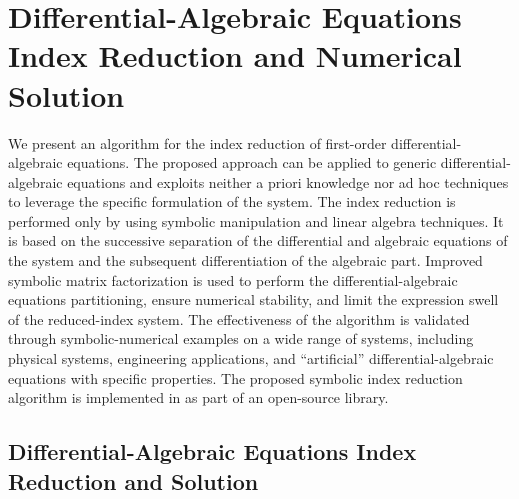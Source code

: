 
\chapter[DAEs Index Reduction and Numerical Solution]{Differential-Algebraic Equations Index Reduction and Numerical Solution}
\label{chap3:daes}

We present an algorithm for the index reduction of first-order differential-algebraic equations. The proposed approach can be applied to generic differential-algebraic equations and exploits neither a priori knowledge nor ad hoc techniques to leverage the specific formulation of the system. The index reduction is performed only by using symbolic manipulation and linear algebra techniques. It is based on the successive separation of the differential and algebraic equations of the system and the subsequent differentiation of the algebraic part. Improved symbolic matrix factorization is used to perform the differential-algebraic equations partitioning, ensure numerical stability, and limit the expression swell of the reduced-index system. The effectiveness of the algorithm is validated through symbolic-numerical examples on a wide range of systems, including physical systems, engineering applications, and ``artificial'' differential-algebraic equations with specific properties. The proposed symbolic index reduction algorithm is implemented in \Maple{} as part of an open-source library.


\section{Differential-Algebraic Equations Index Reduction and Solution}
\label{chap3:sec:introduction}


